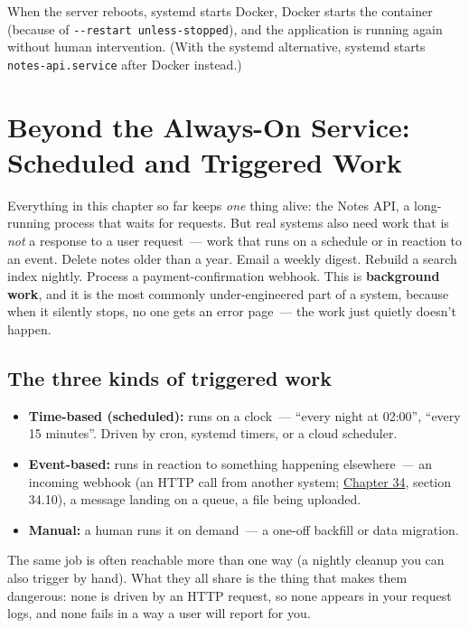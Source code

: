 When the server reboots, systemd starts Docker, Docker starts the container (because of \texttt{-}\allowbreak{}\texttt{-}\allowbreak{}\texttt{restart\ unless-}\allowbreak{}\texttt{stopped}), and the application is running again without human intervention. (With the systemd alternative, systemd starts \texttt{notes-api.service} after Docker instead.)

\setcounter{section}{8}
\section{Beyond the Always-On Service: Scheduled and Triggered Work}\label{25-process-management:259-beyond-the-always-on-service-scheduled-and-triggered-work}

Everything in this chapter so far keeps \emph{one} thing alive: the Notes API, a long-running process that waits for requests. But real systems also need work that is \emph{not} a response to a user request~--- work that runs on a schedule or in reaction to an event. Delete notes older than a year. Email a weekly digest. Rebuild a search index nightly. Process a payment-confirmation webhook. This is \textbf{background work}, and it is the most commonly under-engineered part of a system, because when it silently stops, no one gets an error page~--- the work just quietly doesn't happen.

\subsection*{The three kinds of triggered work}\label{25-process-management:the-three-kinds-of-triggered-work}

\begin{itemize}
\tightlist
\item
  \textbf{Time-based (scheduled):} runs on a clock~--- ``every night at 02:00'', ``every 15 minutes''. Driven by cron, systemd timers, or a cloud scheduler.
\item
  \textbf{Event-based:} runs in reaction to something happening elsewhere~--- an incoming webhook (an HTTP call from another system; \hyperref[ch:34-response-handling]{Chapter 34}, section 34.10), a message landing on a queue, a file being uploaded.
\item
  \textbf{Manual:} a human runs it on demand~--- a one-off backfill or data migration.
\end{itemize}

\noindent{}The same job is often reachable more than one way (a nightly cleanup you can also trigger by hand). What they all share is the thing that makes them dangerous: none is driven by an HTTP request, so none appears in your request logs, and none fails in a way a user will report for you.

